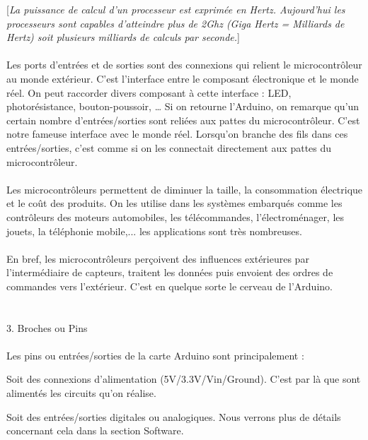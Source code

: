 \documentclass[12pt,a4paper]{article}
\begin{document}
[\textit{La puissance de calcul d'un processeur est exprimée en Hertz. Aujourd'hui les processeurs sont capables d'atteindre plus de 2Ghz (Giga Hertz = Milliards de Hertz) soit plusieurs milliards de calculs par seconde.}]  
\\
\\
Les ports d’entrées et de sorties sont des connexions qui relient le microcontrôleur au monde extérieur. C’est l’interface entre le composant électronique et le monde réel. On peut raccorder divers composant à cette interface : LED, photorésistance, bouton-poussoir, … Si on retourne l’Arduino, on remarque qu’un certain nombre d’entrées/sorties sont reliées aux pattes du microcontrôleur. C’est notre fameuse interface avec le monde réel. Lorsqu’on branche des fils dans ces entrées/sorties, c’est comme si on les connectait directement aux pattes du microcontrôleur.
\\
\\
Les microcontrôleurs permettent de diminuer la taille, la consommation électrique et le coût des produits.
On les utilise dans les systèmes embarqués comme les contrôleurs des moteurs automobiles, les télécommandes, l’électroménager, les jouets, la téléphonie mobile,... les applications sont très nombreuses.
\\
\\
En bref, les microcontrôleurs perçoivent des influences extérieures par l’intermédiaire de capteurs, traitent les données puis envoient des ordres de commandes vers l’extérieur. C’est en quelque sorte le cerveau de l’Arduino.
\\
\\
\\
3. Broches ou Pins
\\
\\
Les pins ou entrées/sorties de la carte Arduino sont principalement :
\begin{compactitem}

\item Soit des connexions d’alimentation (5V/3.3V/Vin/Ground). C’est par là que sont alimentés les circuits qu’on réalise.
\\
\item Soit des entrées/sorties digitales ou analogiques. Nous verrons plus de détails concernant cela dans la section Software.

\end{compactitem}
\bigskip
\end{document}

